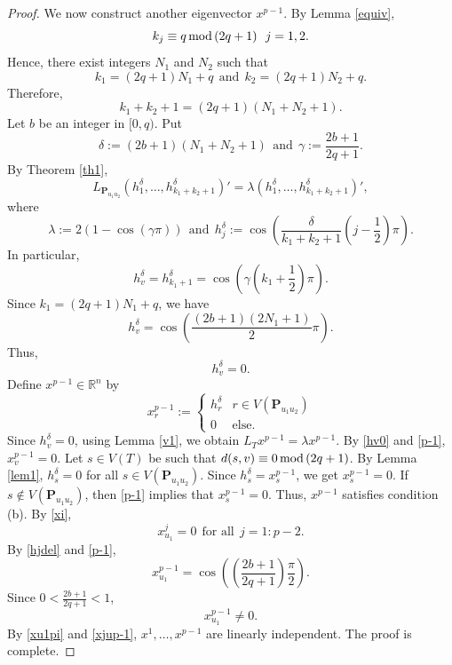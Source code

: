 \documentclass[preprint,12pt]{elsarticle}
\newcommand{\rr}{\mathbb{R}}
\newcommand{\1}{\mathbf{1}}
\newcommand{\0}{\mathbf{0}}
\newcommand{\p}{{\mathbf{P}}}
\def\p{\mathbf{P}}
\begin{document}
\begin{proof}
We now construct another eigenvector $x^{p-1}$. 
By Lemma \ref{equiv},
$$k_j\equiv q\,{\rm{mod}}\,(2q+1)~~j=1,2.$$ 
Hence, there exist integers $N_1$ and $N_2$ such that 
\[k_1=(2q+1)N_1+q~~\mbox{and}~~k_2=(2q+1)N_2+q.\] 
Therefore,
\begin{equation}\label{ksum}
    k_1+k_2+1=(2q+1)(N_1+N_2+1).
\end{equation}
Let $b$ be an integer in $[0,q)$. Put
\begin{equation} \label{deltadefn1}
\delta:=(2b+1)(N_1+N_2+1)~~\text{and}~~\gamma:=\frac{2b+1}{2q+1}. 
\end{equation}
By Theorem \ref{th1}, 
\[L_{\p_{u_1u_2}}(h_1^{\delta},\dotsc,h_{k_1+k_2+1}^{\delta})'=\lambda (h_1^{\delta},\dotsc,h_{k_1+k_2+1}^{\delta})',\]
where
\begin{equation}\label{hjdel}
 \lambda:=2\left(1-\cos (\gamma \pi) \right)~~\mbox{and}~~h_j^{\delta}:=\cos\left(\frac{\delta}{k_1+k_2+1} \left(j-\frac{1}{2} \right)\pi \right).   
\end{equation}
In particular, 
\[h_v^{\delta}=h_{k_1+1}^{\delta}=
        \cos \left(\gamma\left( k_1+\frac{1}{2} \right)\pi  \right).\]
Since $k_1=(2q+1)N_1+q$, we have
       $$h_v^{\delta}= \cos \left( \frac{(2b+1)(2N_1+1)}{2}\pi \right).$$
        Thus,  
        \begin{equation} \label{hv0}
            h_v^{\delta}=0.
        \end{equation}
        Define $x^{p-1}\in \rr^n$ by
\begin{equation}\label{p-1}
x^{p-1}_r:=
\begin{cases}
h_r^{\delta} & r\in V(\p_{u_1u_2}) \\
0 & \mbox{else.}
\end{cases}    
\end{equation}
Since $h_v^{\delta}=0$, using Lemma \ref{v1}, we obtain
$L_Tx^{p-1}=\lambda x^{p-1}$.
By \eqref{hv0} and \eqref{p-1},
$x^{p-1}_v=0$. Let $s\in V(T)$ be such that $d(s,v)\equiv 0\,{\rm{mod}}\,(2q+1)$. 
By Lemma  \ref{lem1}, 
$h_s^{\delta}=0$ for all $s\in V(\p_{u_1u_2})$.
Since $h_s^{\delta}=x_s^{p-1}$, we get $x_s^{p-1}=0$. If $s\notin V(\p_{u_1u_2})$, then \eqref{p-1} implies that $x_s^{p-1}=0$. Thus, $x^{p-1}$ satisfies condition (b).
By \eqref{xi},
\begin{equation}\label{xu1pi}
 x^j_{u_1}=0~~\mbox{for all}~~j=1:p-2.   
\end{equation}
By \eqref{hjdel} and \eqref{p-1},
\begin{equation*}
  x^{p-1}_{u_1}= \cos\left(\left( \frac{2b+1}{2q+1}\right)\frac{\pi}{2} \right). 
\end{equation*}
Since $0<\frac{2b+1}{2q+1}<1$, 
\begin{equation}\label{xjup-1}
  x^{p-1}_{u_1}\neq 0. 
\end{equation}
By \eqref{xu1pi} and \eqref{xjup-1}, $x^1,\dotsc,x^{p-1}$ are linearly independent.
The proof is complete.
\end{proof}
\end{document}
